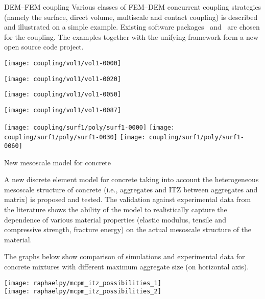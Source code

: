 \documentclass{phdposter}
\begin{document}
\postervspace

\begin{posterframe}{.49\textwidth}{DEM--FEM coupling}
Various classes of FEM--DEM concurrent coupling strategies (namely the surface, direct volume, multiscale and contact coupling) is described and illustrated on a simple example.
Existing software packages \OOFEM\ and \YADE\ are chosen for the coupling.
The examples together with the unifying framework form a new open source code project.
\par
\centering
	\texttt{[image: coupling/vol1/vol1-0000]}\par
	\texttt{[image: coupling/vol1/vol1-0020]}\par
	\texttt{[image: coupling/vol1/vol1-0050]}\par
	\texttt{[image: coupling/vol1/vol1-0087]}\par
	\vspace{3mm}
	\texttt{[image: coupling/surf1/poly/surf1-0000]}
	\texttt{[image: coupling/surf1/poly/surf1-0030]}
	\texttt{[image: coupling/surf1/poly/surf1-0060]}
\end{posterframe}
%
\hfill
%
\begin{posterframe}{.49\textwidth}{New mesoscale model for concrete}
\begin{minipage}[c]{.29\textwidth}
	A new discrete element model for concrete taking into account the heterogeneous mesoscale structure of concrete (i.e., aggregates and ITZ between aggregates and matrix) is proposed and tested.
	The validation against experimental data from the literature shows the ability of the model to realistically capture the dependence of various material properties (elastic modulus, tensile and compressive strength, fracture energy) on the actual mesoscale structure of the material.

	The graphs below show comparison of simulations and experimental data for concrete mixtures with different maximum aggregate size (on horizontal axis).
\end{minipage}
\hfill
\begin{minipage}[r]{.17\textwidth}
	\texttt{[image: raphaelpy/mcpm\_itz\_possibilities\_1]}
	\\
	\vspace{-5mm}
	\texttt{[image: raphaelpy/mcpm\_itz\_possibilities\_2]}
\end{minipage}
\begin{center}
	\hspace*{-2cm}
	\hspace{-2cm}
	\begin{turn}{90}\end{turn}
\end{center}
\end{posterframe}
\end{document}
